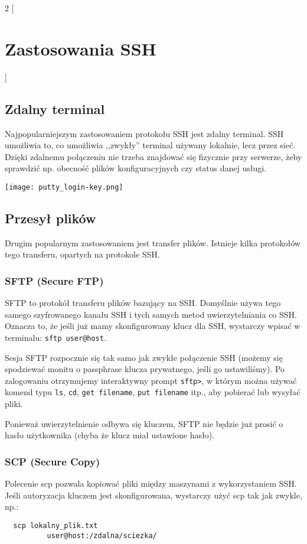 \documentclass{article}
\begin{document}
\begin{multicols}{2}
[
\section{Zastosowania SSH}
]
\subsection{Zdalny terminal}
Najpopularniejszym zastosowaniem protokołu SSH jest zdalny terminal. SSH umożliwia to, co umożliwia ,,zwykły'' terminal używany lokalnie, lecz przez sieć. Dzięki zdalnemu połączeniu nie trzeba znajdować się fizycznie przy serwerze, żeby sprawdzić np. obecność plików konfiguracyjnych czy status danej usługi.

\noindent
\texttt{[image: putty\_login-key.png]}

\subsection{Przesył plików}
Drugim popularnym zastosowaniem jest transfer plików. Istnieje kilka protokołów tego transferu, opartych na protokole SSH.

\subsubsection{SFTP (Secure FTP)}
SFTP to protokół transferu plików bazujący na SSH. Domyślnie używa tego samego szyfrowanego kanału SSH i tych samych metod uwierzytelniania co SSH. Oznacza to, że jeśli już mamy skonfigurowany klucz dla SSH, wystarczy wpisać w terminalu: \verb|sftp user@host|.

Sesja SFTP rozpocznie się tak samo jak zwykłe połączenie SSH (możemy się spodziewać monitu o passphrase klucza prywatnego, jeśli go ustawiliśmy). Po zalogowaniu otrzymujemy interaktywny prompt \verb|sftp>|, w którym można używać komend typu \verb|ls|, \verb|cd|, \verb|get filename|, \verb|put filename| itp., aby pobierać lub wysyłać pliki\cite{digitalsftp}. 

Ponieważ uwierzytelnienie odbywa się kluczem, SFTP nie będzie już prosić o hasło użytkownika (chyba że klucz miał ustawione hasło).

\subsubsection{SCP (Secure Copy)}
Polecenie scp pozwala kopiować pliki między maszynami z wykorzystaniem SSH. Jeśli autoryzacja kluczem jest skonfigurowana, wystarczy użyć scp tak jak zwykle, np.: 
\begin{verbatim}
  scp lokalny_plik.txt
          user@host:/zdalna/sciezka/
\end{verbatim}


\end{multicols}
\end{document}
